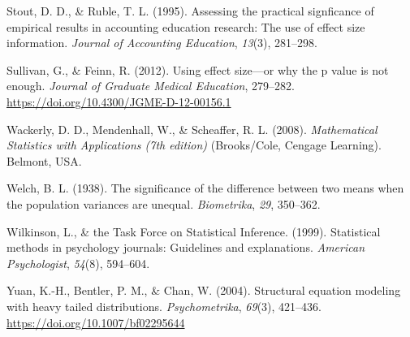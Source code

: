 \documentclass[
  english,
  man,floatsintext]{apa6}
\begin{document}
\leavevmode\hypertarget{ref-Stout_Ruble_1995}{}%
Stout, D. D., \& Ruble, T. L. (1995). Assessing the practical signficance of empirical results in accounting education research: The use of effect size information. \emph{Journal of Accounting Education}, \emph{13}(3), 281--298.

\leavevmode\hypertarget{ref-Sullivan_Feinn_2012}{}%
Sullivan, G., \& Feinn, R. (2012). Using effect size---or why the p value is not enough. \emph{Journal of Graduate Medical Education}, 279--282. \url{https://doi.org/10.4300/JGME-D-12-00156.1}

\leavevmode\hypertarget{ref-Wackerly_et_al_2008}{}%
Wackerly, D. D., Mendenhall, W., \& Scheaffer, R. L. (2008). \emph{Mathematical Statistics with Applications (7th edition)} (Brooks/Cole, Cengage Learning). Belmont, USA.

\leavevmode\hypertarget{ref-Welch_1938}{}%
Welch, B. L. (1938). The significance of the difference between two means when the population variances are unequal. \emph{Biometrika}, \emph{29}, 350--362.

\leavevmode\hypertarget{ref-Wilkinson_1999}{}%
Wilkinson, L., \& the Task Force on Statistical Inference. (1999). Statistical methods in psychology journals: Guidelines and explanations. \emph{American Psychologist}, \emph{54}(8), 594--604.

\leavevmode\hypertarget{ref-Yuan_et_al_2004}{}%
Yuan, K.-H., Bentler, P. M., \& Chan, W. (2004). Structural equation modeling with heavy tailed distributions. \emph{Psychometrika}, \emph{69}(3), 421--436. \url{https://doi.org/10.1007/bf02295644}


\clearpage
\makeatletter
\efloat@restorefloats
\makeatother
\end{document}
